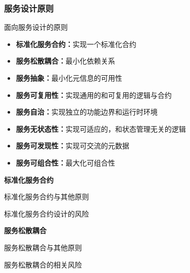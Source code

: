 \subsubsection*{服务设计原则}

面向服务设计的原则
\vspace{-0.8em}
\begin{multicols}{2}
    \begin{itemize}
        \item \textbf{标准化服务合约：}实现一个标准化合约
        \item \textbf{服务松散耦合：}最小化依赖关系
        \item \textbf{服务抽象：}最小化元信息的可用性
        \item \textbf{服务可复用性：}实现通用的和可复用的逻辑与合约
        \item \textbf{服务自治：}实现独立的功能边界和运行时环境
        \item \textbf{服务无状态性：}实现可适应的，和状态管理无关的逻辑
        \item \textbf{服务可发现性：}实现可交流的元数据
        \item \textbf{服务可组合性：}最大化可组合性
    \end{itemize}
\end{multicols}
\vspace{-1em}

\textbf{标准化服务合约} \par
标准化服务合约与其他原则
\begin{spacing}{1.2}
    \vspace{-0.5em}
    
    \vspace{-1em}
\end{spacing}

标准化服务合约设计的风险
\begin{spacing}{1.2}
    \vspace{-0.5em}
    
    \vspace{-1em}
\end{spacing}

\textbf{服务松散耦合} \par
服务松散耦合与其他原则
\begin{spacing}{1.2}
    \vspace{-0.5em}
    
    \vspace{-1em}
\end{spacing}

服务松散耦合的相关风险
\begin{spacing}{1.2}
    \vspace{-0.5em}
    
    \vspace{-1em}
\end{spacing}

